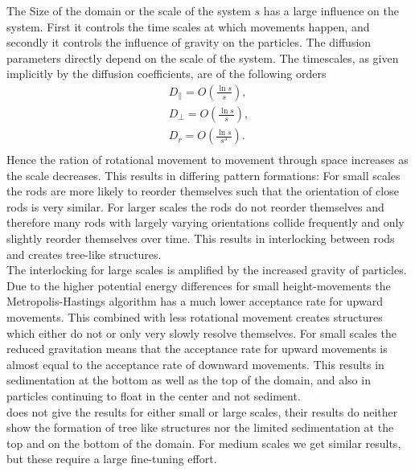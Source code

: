 The Size of the domain or the scale of the system $s$ has a large influence on the system. First it controls the time scales at which movements happen, and secondly it controls the influence of gravity on the particles.
The diffusion parameters directly depend on the scale of the system. The timescales, as given implicitly by the diffusion coefficients, are of the following orders
\begin{equation}
\begin{array}{RLL}
        D_\| = O(\frac{\ln s}{s}),\\
        D_\perp = O(\frac{\ln s}{s}),\\
        D_r = O(\frac{\ln s}{s^3}).\\
\end{array}
\end{equation}
Hence the ration of rotational movement to movement through space increases as the scale decreases. This results in differing pattern formations:
For small scales the rods are more likely to reorder themselves such that the orientation of close rods is very similar. For larger scales the rods do not reorder themselves and therefore many rods with largely varying orientations collide frequently and only slightly reorder themselves over time. This results in interlocking between rods and creates tree-like structures.\\
The interlocking for large scales is amplified by the increased gravity of particles. Due to the higher potential energy differences for small height-movements the Metropolis-Hastings algorithm has a much lower acceptance rate for upward movements. This combined with less rotational movement creates structures which either do not or only very slowly resolve themselves. For small scales the reduced gravitation means that the acceptance rate for upward movements is almost equal to the acceptance rate of downward movements. This results in sedimentation at the bottom as well as the top of the domain, and also in particles continuing to float in the center and not sediment.\\
\cite{SED} does not give the results for either small or large scales, their results do neither show the formation of tree like structures nor the limited sedimentation at the top and on the bottom of the domain. For medium scales we get similar results, but these require a large fine-tuning effort.
